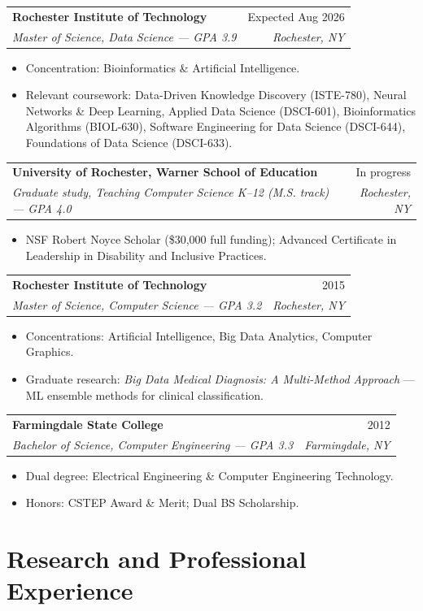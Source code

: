 \documentclass[11pt]{article}
\makeatletter
\newcommand{\entry}[4]{
  \noindent\begin{tabularx}{\textwidth}{@{}Xr@{}}
    \textbf{#1} & #2 \\
    \textit{#3} & \textit{#4}
  \end{tabularx}\vspace{2pt}
}
\makeatother
\begin{document}
\entry{Rochester Institute of Technology}{Expected Aug 2026}{Master of Science, Data Science --- GPA 3.9}{Rochester, NY}
\begin{itemize}
  \item Concentration: Bioinformatics \& Artificial Intelligence.
  \item Relevant coursework: Data-Driven Knowledge Discovery (ISTE-780), Neural Networks \& Deep Learning, Applied Data Science (DSCI-601), Bioinformatics Algorithms (BIOL-630), Software Engineering for Data Science (DSCI-644), Foundations of Data Science (DSCI-633).
\end{itemize}

\entry{University of Rochester, Warner School of Education}{In progress}{Graduate study, Teaching Computer Science K--12 (M.S. track) --- GPA 4.0}{Rochester, NY}
\begin{itemize}
  \item NSF Robert Noyce Scholar (\$30,000 full funding); Advanced Certificate in Leadership in Disability and Inclusive Practices.
\end{itemize}

\entry{Rochester Institute of Technology}{2015}{Master of Science, Computer Science --- GPA 3.2}{Rochester, NY}
\begin{itemize}
  \item Concentrations: Artificial Intelligence, Big Data Analytics, Computer Graphics.
  \item Graduate research: \textit{Big Data Medical Diagnosis: A Multi-Method Approach} --- ML ensemble methods for clinical classification.
\end{itemize}

\entry{Farmingdale State College}{2012}{Bachelor of Science, Computer Engineering --- GPA 3.3}{Farmingdale, NY}
\begin{itemize}
  \item Dual degree: Electrical Engineering \& Computer Engineering Technology.
  \item Honors: CSTEP Award \& Merit; Dual BS Scholarship.
\end{itemize}

\section{Research and Professional Experience}
\end{document}
